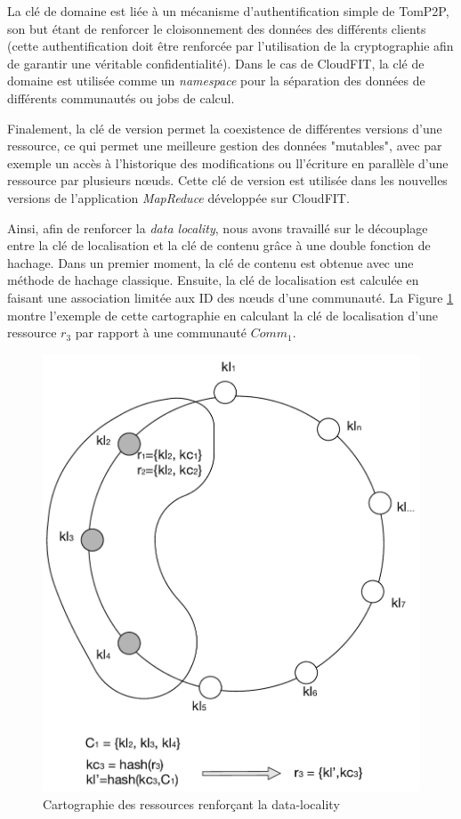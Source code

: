La clé de domaine est liée à un mécanisme d'authentification simple de TomP2P, son but étant de renforcer le cloisonnement des données des différents clients (cette authentification doit être renforcée par l'utilisation de la cryptographie afin de garantir une véritable confidentialité). Dans le cas de CloudFIT, la clé de domaine est utilisée comme un \textit{namespace} pour la séparation des données de différents communautés ou jobs de calcul. 

Finalement, la clé de version permet la coexistence de différentes versions d'une ressource, ce qui permet une meilleure gestion des données "mutables", avec par exemple un accès à l'historique des modifications ou ll'écriture en parallèle d'une ressource par plusieurs n{\oe}uds. Cette clé de version est utilisée dans les nouvelles versions de l'application \textit{MapReduce} développée sur CloudFIT.

Ainsi, afin de renforcer la \textit{data locality}, nous avons travaillé sur le découplage entre la clé de localisation et la clé de contenu grâce à une double fonction de hachage. Dans un premier moment, la clé de contenu est obtenue avec une méthode de hachage classique. Ensuite, la clé de localisation est calculée en faisant une association limitée aux ID des n{\oe}uds d'une communauté. La Figure \ref{fig:hash} montre l'exemple de cette cartographie en calculant la clé de localisation d'une ressource $r_3$ par rapport à une communauté $Comm_1$.

\begin{figure}[!ht]
	\centering
	\includegraphics[width=0.5\linewidth]{img/hashing.pdf}
	\caption{Cartographie des ressources renforçant la data-locality}
	\label{fig:hash}
\end{figure}

